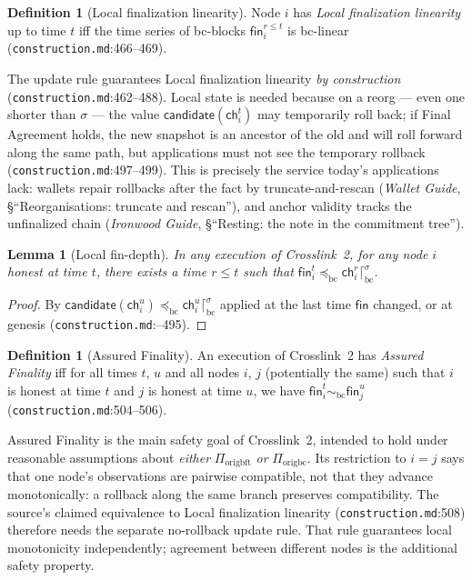\documentclass[11pt,a4paper]{article}
\newtheorem{lemma}[theorem]{Lemma}
\theoremstyle{definition}
\newtheorem{definition}[theorem]{Definition}
\begin{document}
\begin{definition}[Local finalization linearity]\label{def:xl-lfl}
Node $i$ has \emph{Local finalization linearity} up to time $t$ iff the
time series of bc-blocks $\mathsf{fin}_i^{r \le t}$ is bc-linear
(\texttt{construction.md}:466--469).
\end{definition}

The update rule guarantees Local finalization linearity \emph{by
construction} (\texttt{construction.md}:462--488). Local state is needed
because on a reorg --- even one shorter than $\sigma$ --- the value
$\mathsf{candidate}(\mathsf{ch}_i^t)$ may temporarily roll back; if Final
Agreement holds, the new snapshot is an ancestor of the old and will roll
forward along the same path, but applications must not see the temporary
rollback (\texttt{construction.md}:497--499). This is precisely the
service today's applications lack: wallets repair rollbacks after the
fact by truncate-and-rescan (\emph{Wallet Guide}, \S``Reorganisations:
truncate and rescan''), and anchor validity tracks the unfinalized chain
(\emph{Ironwood Guide}, \S``Resting: the note in the commitment tree'').

\begin{lemma}[Local fin-depth]\label{lem:xl-fin-depth}
In any execution of Crosslink~2, for any node $i$ honest at time $t$,
there exists a time $r \le t$ such that $\mathsf{fin}_i^t
\preceq_{\mathrm{bc}} \mathsf{ch}_i^r \lceil^{\sigma}_{\mathrm{bc}}$.
\end{lemma}
\begin{proof}
By $\mathsf{candidate}(\mathsf{ch}_i^u) \preceq_{\mathrm{bc}}
\mathsf{ch}_i^u \lceil^{\sigma}_{\mathrm{bc}}$ applied at the last time
$\mathsf{fin}$ changed, or at genesis
(\texttt{construction\allowbreak .md}:--495).
\end{proof}

\begin{definition}[Assured Finality]\label{def:xl-assured-finality}
An execution of Crosslink~2 has \emph{Assured Finality} iff for all times
$t$, $u$ and all nodes $i$, $j$ (potentially the same) such that $i$ is
honest at time $t$ and $j$ is honest at time $u$, we have $\mathsf{fin}_i^t
\sim_{\mathrm{bc}} \mathsf{fin}_j^u$ (\texttt{construction.md}:504--506).
\end{definition}

Assured Finality is the main safety goal of Crosslink~2, intended to hold
under reasonable assumptions about \emph{either} $\Pi_{\mathrm{origbft}}$
\emph{or} $\Pi_{\mathrm{origbc}}$. Its restriction to $i = j$ says that
one node's observations are pairwise compatible, not that they advance
monotonically: a rollback along the same branch preserves compatibility.
The source's claimed equivalence to Local finalization linearity
(\texttt{construction.md}:508) therefore needs the separate no-rollback
update rule. That rule guarantees local monotonicity independently;
agreement between different nodes is the additional safety property.
\end{document}
